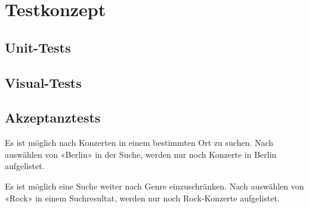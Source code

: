 \clearpage
\section{Testkonzept}\label{testkonzept}

\subsection{Unit-Tests}\label{unittests}


\subsection{Visual-Tests}\label{visualtests}


\clearpage
\subsection{Akzeptanztests}\label{akzeptanztests}




\acceptancetest
  {Es ist möglich nach Konzerten in einem bestimmten Ort zu suchen.}
  {Nach auswählen von «Berlin» in der Suche, werden nur noch Konzerte in Berlin aufgelistet.}

\acceptancetest
  {Es ist möglich eine Suche weiter nach Genre einzuschränken.}
  {Nach auswählen von «Rock» in einem Suchresultat, werden nur noch Rock-Konzerte aufgelistet.}

